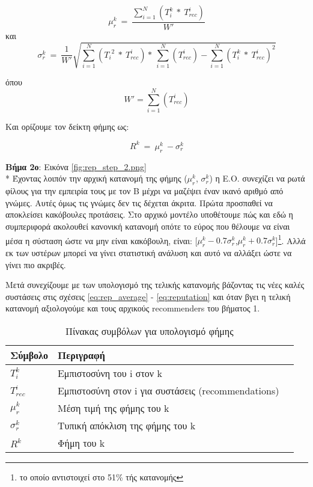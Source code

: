 \begin{equation}\label{eq:rep_average}
 \mu_r^k\  =\ \frac{\sum_{i=1}^{N}\left( T_i^k\ *\ T_{rec}^i \right)}{W'} 
\end{equation}
και
\begin{equation}\label{eq:rep_deviation}
 \sigma_r^k\  =\ \frac{1}{W'} \sqrt{\sum_{i=1}^{N}\left( {T_i}^2\ *\ T_{rec}^i \right)* \ \sum_{i=1}^{N} \left(T_{rec}^i\right)- \sum_{i=1}^{N}\left( T_i^k\ *\ T_{rec}^i \right)^2}
\end{equation}

όπου 
\begin{equation}\label{eq:rep_weight}
 W' = \sum_{i=1}^{N}\left( T_{rec}^i \right)
\end{equation}

Και ορίζουμε τον δείκτη φήμης ως:

\begin{equation}\label{eq:reputation}
 R^k \ = \ \mu_r^k \ - \sigma_r^k 
\end{equation}



\textbf{Βήμα 2ο}: Εικόνα \ref{fig:rep_step_2.png} \\*
 Έχοντας λοιπόν την αρχική κατανομή της φήμης ($\mu_r^k$, $\sigma_r^k$) η Ε.Ο. συνεχίζει να ρωτά φίλους για την εμπειρία τους με τον Β μέχρι να μαζέψει έναν ικανό αριθμό από γνώμες. Αυτές όμως τις γνώμες δεν τις δέχεται άκριτα. Πρώτα προσπαθεί να αποκλείσει κακόβουλες προτάσεις. Στο αρχικό μοντέλο υποθέτουμε πώς και εδώ η συμπεριφορά ακολουθεί κανονική κατανομή οπότε το εύρος που θέλουμε να είναι μέσα η σύσταση ώστε να μην είναι κακόβουλη, είναι: [$\mu_r^k-0.7\sigma_r^k$,$\mu_r^k+0.7\sigma_r^k$]\footnote{το οποίο αντιστοιχεί στο 51\%  τής κατανομής}. Αλλά εκ των υστέρων μπορεί να γίνει στατιστική ανάλυση και αυτό να αλλάξει ώστε να γίνει πιο ακριβές.

Μετά συνεχίζουμε με των υπολογισμό της τελικής κατανομής βάζοντας τις νέες καλές συστάσεις στις σχέσεις \ref{eq:rep_average} - \ref{eq:reputation}  και όταν βγει η τελική κατανομή αξιολογούμε και τους αρχικούς recommenders του βήματος 1.





\begin{table}[H]
    \centering
    \begin{tabular}{ | l | l | l | }
        \hline
        Σύμβολο & Περιγραφή \\ \hline \hline
        $T_i^k$ & Εμπιστοσύνη του i στον k  \\ \hline
        $T_{rec}^i$ & Εμπιστοσύνη στον i για συστάσεις (recommendations) \\ \hline
        $\mu_r^k$ 	& Μέση τιμή της φήμης του k\\ \hline
        $\sigma_r^k$    & Τυπική απόκλιση της φήμης του k \\ \hline
        $R^k$   & Φήμη του k \\ \hline
            \end{tabular}
    \caption{Πίνακας συμβόλων για υπολογισμό φήμης}
    \label{tab:symbols_rep}
\end{table}
